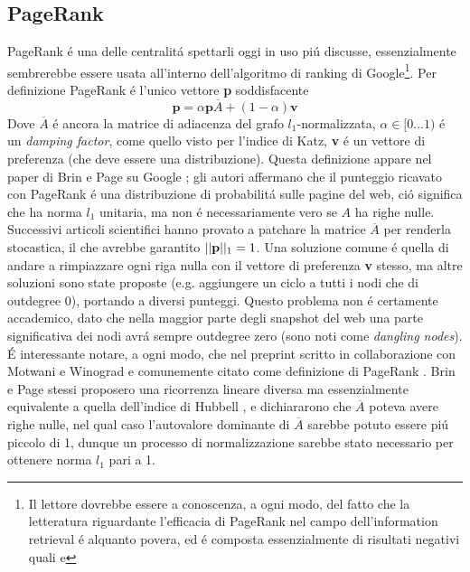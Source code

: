 \subsection{PageRank}
PageRank é una delle centralitá spettarli oggi in uso piú discusse, essenzialmente sembrerebbe essere usata all'interno dell'algoritmo di ranking di Google\footnote{Il lettore dovrebbe essere a conoscenza, a ogni modo, del fatto che la letteratura riguardante l'efficacia di PageRank nel campo dell'information retrieval é alquanto povera, ed é composta essenzialmente di risultati negativi quali %
e
}. Per definizione PageRank é l'unico vettore \textbf{p} soddisfacente
\begin{equation}
    \textbf{p} = \alpha\textbf{p}\overline{A} + (1 - \alpha)\textbf{v}
\end{equation}
Dove $\overline{A}$ é ancora la matrice di adiacenza del grafo $l_1$-normalizzata, $\alpha \in [0\dots1)$ é un \textit{damping factor}, come quello visto per l'indice di Katz, \textbf{v} é un vettore di preferenza (che deve essere una distribuzione). Questa definizione appare nel paper di Brin e Page su Google %
; gli autori affermano che il punteggio ricavato con PageRank é una distribuzione di probabilitá sulle pagine del web, ció significa che ha norma $l_1$ unitaria, ma non é necessariamente vero se $A$ ha righe nulle. Successivi articoli scientifici hanno provato a patchare la matrice $\overline{A}$ per renderla stocastica, il che avrebbe garantito $\lvert\lvert \textbf{p} \rvert\rvert_1 = 1$. Una soluzione comune é quella di andare a rimpiazzare ogni riga nulla con il vettore di preferenza \textbf{v} stesso, ma altre soluzioni sono state proposte (e.g. aggiungere un ciclo a tutti i nodi che di outdegree 0), portando a diversi punteggi. Questo problema non é certamente accademico, dato che nella maggior parte degli snapshot del web una parte significativa dei nodi avrá sempre outdegree zero (sono noti come \textit{dangling nodes}).\\
É interessante notare, a ogni modo, che nel preprint scritto in collaborazione con Motwani e Winograd e comunemente citato come definizione di PageRank %
. Brin e Page stessi proposero una ricorrenza lineare diversa ma essenzialmente equivalente a quella dell'indice di Hubbell %
, e dichiararono che $\overline{A}$ poteva avere righe nulle, nel qual caso l'autovalore dominante di $\overline{A}$ sarebbe potuto essere piú piccolo di 1, dunque un processo di normalizzazione sarebbe stato necessario per ottenere norma $l_1$ pari a 1.\\
